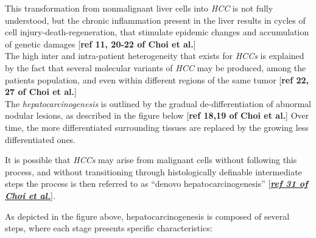 \documentclass[]{article}
\begin{document}
This transformation from nonmalignant liver cells into \emph{HCC} is not
fully understood, but the chronic inflammation present in the liver
results in cycles of cell injury-death-regeneration, that stimulate
epidemic changes and accumulation of genetic damages\emph{
}{[}\textbf{ref 11, 20-22 of Choi et al.}{]}\\
The high inter and intra-patient heterogeneity that exists for
\emph{HCCs} is explained by the fact that several molecular variants of
\emph{HCC} may be produced, among the patients population, and even
within different regions of the same tumor {[}\textbf{ref 22, 27 of Choi
et al.}{]}\\
The \emph{hepatocarcinogenesis} is outlined by the gradual
de-differentiation of abnormal nodular lesions, as described in the
figure below {[}\textbf{ref 18,19 of Choi et al.}{]}\emph{ }Over time,
the more differentiated surrounding tissues are replaced by the growing
less differentiated ones.

It is possible that \emph{HCCs} may arise from malignant cells without
following this process, and without transitioning through histologically
definable intermediate steps the process is then referred to as ``denovo
hepatocarcinogenesis''
{[}\href{https://docs.google.com/document/d/1F5IUt9O-m_2LUTsJQI_7g8W_0PEHzx9hDfyjPOJ7yvo/edit\#heading=h.tuamaz8z9u81}{\emph{\textbf{ref
31 of Choi et al.}}}{]}.

As depicted in the figure above, hepatocarcinogenesis is composed of
several steps, where each stage presents specific characteristics:
\end{document}

